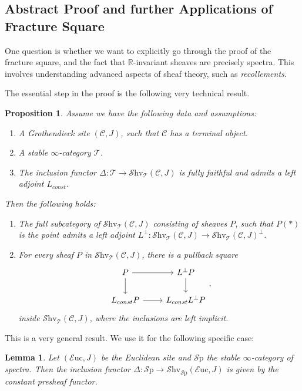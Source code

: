 \documentclass[10pt]{amsart}
\newcommand{\C}{\mathscr{C}}
\newcommand{\T}{\mathscr{T}}
\newcommand{\bR}{\mathbb{R}}
\newcommand{\Sp}{\mathscr{S}\mathrm{p}}
\newcommand{\Euc}{\mathscr{E}\mathrm{uc}}
\newcommand{\Shv}{\mathscr{S}\mathrm{hv}}
\newtheorem{lemma}[equation]{Lemma}
\newtheorem{proposition}[equation]{Proposition}
\theoremstyle{definition}
\theoremstyle{remark}
\numberwithin{equation}{section}
\begin{document}
\subsection{Abstract Proof and further Applications of Fracture Square}
One question is whether we want to explicitly go through the proof of the fracture square, and the fact that $\bR$-invariant sheaves are precisely spectra. This involves understanding advanced aspects of sheaf theory, such as \emph{recollements}.

The essential step in the proof is the following very technical result.

\begin{proposition}
  Assume we have the following data and assumptions:
  \begin{enumerate}
    \item A Grothendieck site $(\C,J)$, such that $\C$ has a terminal object.
    \item A stable $\infty$-category $\T$.
    \item The inclusion functor $\Delta\colon \T \to \Shv_\T(\C,J)$ is fully faithful and admits a left adjoint $L_{const}$. 
  \end{enumerate}
  Then the following holds:
  \begin{enumerate}
    \item The full subcategory of $\Shv_\T(\C,J)$ consisting of sheaves $P$, such that $P(*)$ is the point admits a left adjoint $L^{\bot}\colon \Shv_\T(\C,J) \to \Shv_\T(\C,J)^\bot$.
    \item For every sheaf $P$ in $\Shv_\T(\C,J)$, there is a pullback square
    \[
    \begin{tikzcd}
      P \arrow[r] \arrow[d] & L^{\bot}P \arrow[d] \\
      L_{const}P \arrow[r] & L_{const}L^{\bot}P
    \end{tikzcd},
    \]
    inside $\Shv_\T(\C,J)$, where the inclusions are left implicit.
  \end{enumerate} 
\end{proposition}

This is a very general result. We use it for the following specific case:
\begin{lemma}
 Let $(\Euc,J)$ be the Euclidean site and $\Sp$ the stable $\infty$-category of spectra. Then the inclusion functor $\Delta\colon \Sp \to \Shv_{\Sp}(\Euc,J)$ is given by the constant presheaf functor.
\end{lemma}
\end{document}
